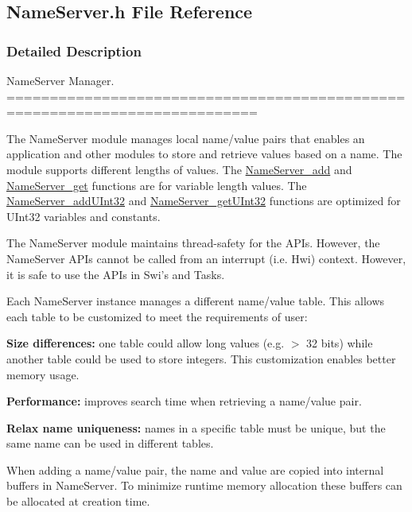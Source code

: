 \subsection{Name\-Server.\-h File Reference}
\label{_name_server_8h}


\subsubsection{Detailed Description}
Name\-Server Manager. ===========================================================================

The Name\-Server module manages local name/value pairs that enables an application and other modules to store and retrieve values based on a name. The module supports different lengths of values. The \hyperlink{_name_server_8h_ad7d45ed8fe5bcd1f10da5914c8da39f5}{Name\-Server\-\_\-add} and \hyperlink{_name_server_8h_a5f1013e57e7c5da9f003063d70a76e01}{Name\-Server\-\_\-get} functions are for variable length values. The \hyperlink{_name_server_8h_ac130195a04a34dfa2daba6ec3fff65d6}{Name\-Server\-\_\-add\-U\-Int32} and \hyperlink{_name_server_8h_ac3b6fa4f8f0ed572f1a5f6b7cb05679e}{Name\-Server\-\_\-get\-U\-Int32} functions are optimized for U\-Int32 variables and constants.

The Name\-Server module maintains thread-\/safety for the A\-P\-Is. However, the Name\-Server A\-P\-Is cannot be called from an interrupt (i.\-e. Hwi) context. However, it is safe to use the A\-P\-Is in Swi's and Tasks.

Each Name\-Server instance manages a different name/value table. This allows each table to be customized to meet the requirements of user\-: \begin{DoxyItemize}
\item {\bfseries Size differences\-:} one table could allow long values (e.\-g. $>$ 32 bits) while another table could be used to store integers. This customization enables better memory usage. \item {\bfseries Performance\-:} improves search time when retrieving a name/value pair. \item {\bfseries Relax name uniqueness\-:} names in a specific table must be unique, but the same name can be used in different tables.\end{DoxyItemize}
When adding a name/value pair, the name and value are copied into internal buffers in Name\-Server. To minimize runtime memory allocation these buffers can be allocated at creation time.

